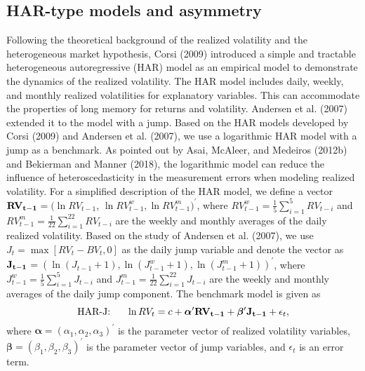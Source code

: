 \documentclass[10pt]{article}
\begin{document}
\subsection{HAR-type models and asymmetry}
Following the theoretical background of the realized volatility and the heterogeneous market hypothesis, 
Corsi (2009) introduced a simple and tractable heterogeneous autoregressive (HAR) model as an empirical model to demonstrate the dynamics of the realized volatility. 
The HAR model includes daily, weekly, and monthly realized volatilities for explanatory variables. 
This can accommodate the properties of long memory for returns and volatility. 
Andersen et al. (2007) extended it to the model with a jump. 
Based on the HAR models developed by Corsi (2009) and Andersen et al. (2007), 
we use a logarithmic HAR model with a jump as a benchmark. 
As pointed out by Asai, McAleer, and Medeiros (2012b) and Bekierman and Manner (2018), 
the logarithmic model can reduce the influence of heteroscedasticity in the measurement errors when modeling realized volatility.  
For a simplified description of the HAR model, 
we define a vector ${\bf RV_{t-1}}$$=(\ln RV_{t-1}$, $\ln RV_{t-1}^w, \ln RV_{t-1}^m )^{\prime}$, 
where $RV_{t-1}^w=\frac{1}{5}\sum_{i=1}^5 RV_{t-i}$ and  $RV_{t-1}^m=\frac{1}{22}\sum_{i=1}^{22} RV_{t-i}$ are the weekly and monthly averages of the daily realized volatility. 
Based on the study of Andersen et al. (2007), we use $J_t=\max[RV_t-BV_t,0]$ as the daily jump variable and denote the vector as ${\bf J_{t-1}}$$=(\ln (J_{t-1}+1), \ln (J_{t-1}^w+1), \ln (J_{t-1}^m+1))^{\prime}$, 
where $J_{t-1}^w=\frac{1}{5}\sum_{i=1}^5 J_{t-i}$ and $J_{t-1}^m=\frac{1}{22}\sum_{i=1}^{22} J_{t-i}$ are the weekly and monthly averages of the daily jump component. 
The benchmark model is given as 
\begin{equation}
\text{HAR-J:} \ \ \ \ \ \ln RV_t=c+{\boldsymbol  \alpha}^{\prime} {\bf RV_{t-1}} +{\boldsymbol  \beta}^{\prime} {\bf J_{t-1}} +\epsilon_t, 
\end{equation}
where ${\boldsymbol  \alpha}=(\alpha_1,\alpha_2,\alpha_3)^{\prime}$ is the parameter vector of realized volatility variables, 
${\boldsymbol  \beta}=(\beta_1,\beta_2,\beta_3)^{\prime}$ is the parameter vector of jump variables, 
and $\epsilon_t$ is an error term. 
\end{document}

